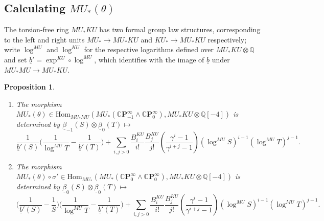 \documentclass[10pt,a4paper]{amsart}
\newtheorem{prop}[thm]{Proposition}
\theoremstyle{definition}
\theoremstyle{remark}
\renewcommand{\hom}{\mathrm{Hom}}
\newcommand{\rat}{\mathbb{Q}}
\newcommand{\cp}{\mathbb{C} \mathbf{P}^\infty}
\renewcommand{\smash}{\wedge}
\begin{document}
\subsection{Calculating $MU_* (\theta)$}


The torsion-free ring $MU_*KU$ has two formal group law structures, corresponding to the left and right units $MU_* \rightarrow
MU_*KU$ and $KU_* \rightarrow MU_* KU$ respectively; write $\log^{MU}$ and $\log^{KU}$ for the respective  logarithms
defined  over $MU_* KU \otimes \rat$ and set  $\underline{b}' = \exp^{KU} \circ \log^{MU}$, which identifies
with the image of $\underline{b}$ under $MU_*MU \rightarrow MU_*KU$.


\begin{prop}
\label{prop:MUtheta_sigmap}
\
\begin{enumerate}
\item
The morphism $MU_*(\theta)\in \hom_{MU_*MU} (MU_* (\cp_{-1} \smash \cp_0 ), MU_* KU \otimes \rat[-4]) $ is
determined by
$
 \underline{\beta}_{-1} (S) \otimes \underline{\beta}_0 (T)
\mapsto $
\[
 \frac{1}{\underline{b}'(S)}
\Big(\frac{1}{\log^{MU} T} - \frac{1}{\underline{b}' (T) }\Big)
+
\sum _{i, j >0}\frac{B_i^{KU}}{i!}\frac{B_j^{KU}}{j!}
\left(
\frac{\gamma^i -1}{\gamma^{i+j}-1}
\right)
(\log^{MU} S)^{i-1}(\log ^{MU} T) ^{j-1}.
\]
 \item
The morphism $MU_*(\theta) \circ \sigma' \in \hom_{MU_*} (MU_* (\cp_0 \smash \cp_0 ), MU_* KU \otimes \rat[-4]) $ is
determined by
$
 \underline{\beta}_0 (S) \otimes \underline{\beta}_0 (T)
\mapsto $
\[
\Big( \frac{1}{\underline{b}'(S)}- \frac{1}{S}\Big)
\Big(\frac{1}{\log^{MU} T} - \frac{1}{\underline{b}' (T) }\Big)
+
\sum _{i, j >0}\frac{B_i^{KU}}{i!}\frac{B_j^{KU}}{j!}
\left(
\frac{\gamma^i -1}{\gamma^{i+j}-1}
\right)
(\log^{MU} S)^{i-1}(\log ^{MU} T) ^{j-1}.
\]
\end{enumerate}
\end{prop}
\end{document}

